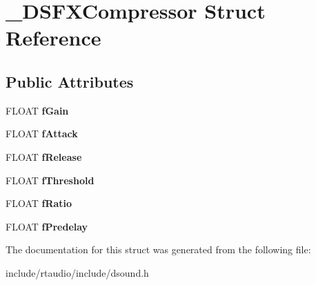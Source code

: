 \hypertarget{struct___d_s_f_x_compressor}{}\section{\+\_\+\+D\+S\+F\+X\+Compressor Struct Reference}
\label{struct___d_s_f_x_compressor}
\subsection*{Public Attributes}
\begin{DoxyCompactItemize}
\item 
F\+L\+O\+AT {\bfseries f\+Gain}\hypertarget{struct___d_s_f_x_compressor_aae3eb061d38e6c7f0e8822f63ec29698}{}\label{struct___d_s_f_x_compressor_aae3eb061d38e6c7f0e8822f63ec29698}

\item 
F\+L\+O\+AT {\bfseries f\+Attack}\hypertarget{struct___d_s_f_x_compressor_a938bc0038100c925f8d8b27d18aa6e67}{}\label{struct___d_s_f_x_compressor_a938bc0038100c925f8d8b27d18aa6e67}

\item 
F\+L\+O\+AT {\bfseries f\+Release}\hypertarget{struct___d_s_f_x_compressor_a28b0f69f78e86d721648f81ca5376ccd}{}\label{struct___d_s_f_x_compressor_a28b0f69f78e86d721648f81ca5376ccd}

\item 
F\+L\+O\+AT {\bfseries f\+Threshold}\hypertarget{struct___d_s_f_x_compressor_a9b7408b6d6df1a93e8d8130026b2fc08}{}\label{struct___d_s_f_x_compressor_a9b7408b6d6df1a93e8d8130026b2fc08}

\item 
F\+L\+O\+AT {\bfseries f\+Ratio}\hypertarget{struct___d_s_f_x_compressor_a13238dd6b76e26335f5fcc078c49373b}{}\label{struct___d_s_f_x_compressor_a13238dd6b76e26335f5fcc078c49373b}

\item 
F\+L\+O\+AT {\bfseries f\+Predelay}\hypertarget{struct___d_s_f_x_compressor_a1b5e2c2578d0607f364715fe2e40579d}{}\label{struct___d_s_f_x_compressor_a1b5e2c2578d0607f364715fe2e40579d}

\end{DoxyCompactItemize}


The documentation for this struct was generated from the following file\+:\begin{DoxyCompactItemize}
\item 
include/rtaudio/include/dsound.\+h\end{DoxyCompactItemize}
